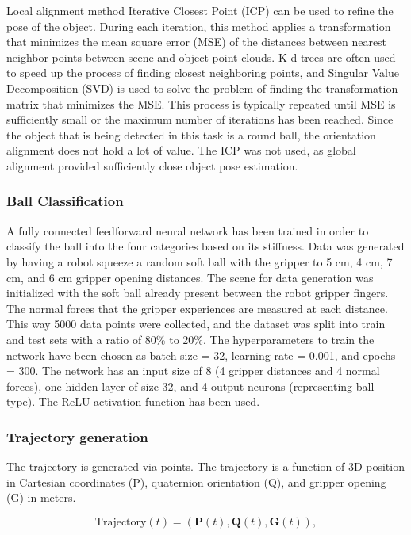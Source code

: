 \bigskip \noindent
Local alignment method Iterative Closest Point (ICP) can be used to refine the pose of the object. During each iteration, this method applies a transformation that minimizes the mean square error (MSE) of the distances between nearest neighbor points between scene and object point clouds. K-d trees are often used to speed up the process of finding closest neighboring points, and Singular Value Decomposition (SVD) is used to solve the problem of finding the transformation matrix that minimizes the MSE. This process is typically repeated until MSE is sufficiently small or the maximum number of iterations has been reached. Since the object that is being detected in this task is a round ball, the orientation alignment does not hold a lot of value. The ICP was not used, as global alignment provided sufficiently close object pose estimation.

\subsubsection{Ball Classification}
A fully connected feedforward neural network has been trained in order to classify the ball into the four categories based on its stiffness. Data was generated by having a robot squeeze a random soft ball with the gripper to 5 cm, 4 cm, 7 cm, and 6 cm gripper opening distances. The scene for data generation was initialized with the soft ball already present between the robot gripper fingers. The normal forces that the gripper experiences are measured at each distance. This way 5000 data points were collected, and the dataset was split into train and test sets with a ratio of 80\% to 20\%. The hyperparameters to train the network have been chosen as batch size = 32, learning rate = 0.001, and epochs = 300. The network has an input size of 8 (4 gripper distances and 4 normal forces), one hidden layer of size 32, and 4 output neurons (representing ball type). The ReLU activation function has been used.

\subsubsection{Trajectory generation}
The trajectory is generated via points. The trajectory is a function of 3D position in Cartesian coordinates (P), quaternion orientation (Q), and gripper opening (G) in meters. 

\begin{equation}
\text{Trajectory}(t) = (\mathbf{P}(t), \mathbf{Q}(t), \mathbf{G}(t)),
\end{equation}

